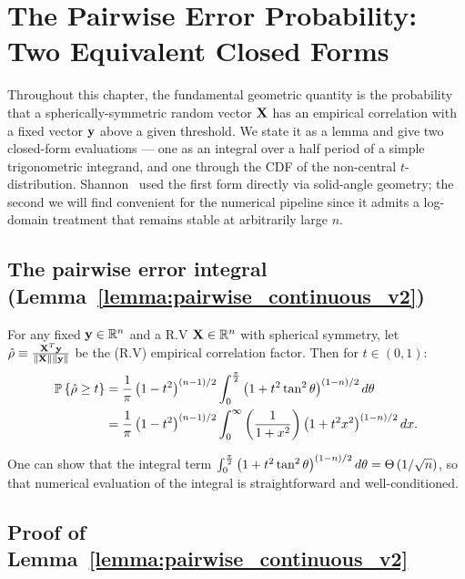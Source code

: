 \section{The Pairwise Error Probability: Two Equivalent Closed Forms}
\label{sec:awgn2-foundation}

Throughout this chapter, the fundamental geometric quantity is the probability that a spherically-symmetric random vector $\textbf{X}$ has an empirical correlation with a fixed vector $\mathbf{y}$ above a given threshold.  We state it as a lemma and give two closed-form evaluations --- one as an integral over a half period of a simple trigonometric integrand, and one through the CDF of the non-central $t$-distribution.  Shannon~\cite{shannon1959probability} used the first form directly via solid-angle geometry; the second we will find convenient for the numerical pipeline since it admits a log-domain treatment that remains stable at arbitrarily large $n$.

\subsection{The pairwise error integral (Lemma~\ref{lemma:pairwise_continuous_v2})}

\begin{lemma}\label{lemma:pairwise_continuous_v2}
	For any fixed $\mathbf{y}\in \mathbb{R}^n$ and a R.V $\textbf{X}\in \mathbb{R}^n$ with spherical symmetry, let $\hat\rho \equiv \frac{\textbf{X}^T \mathbf{y}}{\left\Vert \textbf{X} \right\Vert \left\Vert \mathbf{y} \right\Vert}$ be the (R.V) empirical correlation factor. Then for $t\in(0,1)$:
	\begin{align*}
		\mathbb{P}\left\{ \hat\rho \geq t \right\}  &=\frac{1}{\pi} \left( 1-t^2 \right)^{(n-1)/2} \int_{0}^{\frac \pi 2} \left( 1+t^2\tan^2 \theta \right)^{(1-n)/2} d \theta \\
		&=\frac{1}{\pi} \left( 1-t^2 \right)^{(n-1)/2} \int_{0}^{\infty}\left( 1\over 1+x^2  \right) \left( 1+t^2 x^2  \right)^{(1-n)/2} dx.
	\end{align*}
\end{lemma}

\begin{remark}
	One can show that the integral term $\int_{0}^{\frac \pi 2} \left( 1+t^2\tan^2 \theta \right)^{(1-n)/2} d \theta =\Theta\left( 1/\sqrt{n} \right)$, so that numerical evaluation of the integral is straightforward and well-conditioned.
\end{remark}

\subsection{Proof of Lemma~\ref{lemma:pairwise_continuous_v2}}\label{appendix:pairwise_continuous_v2}

